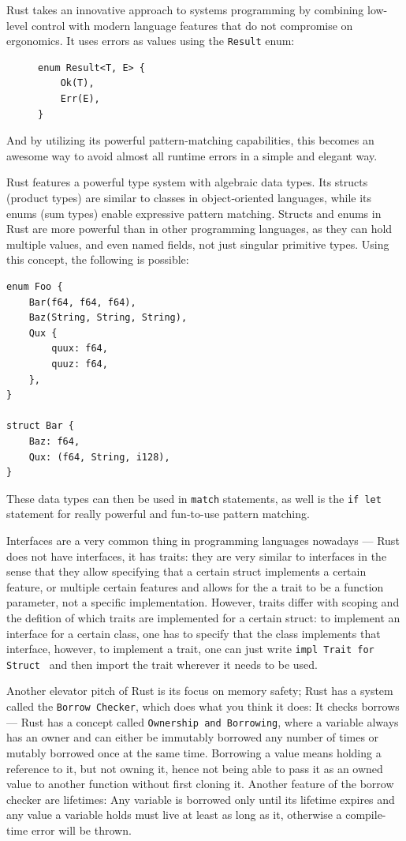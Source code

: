 Rust takes an innovative approach to systems programming by combining low-level control with modern language features
that do not compromise on ergonomics. It uses errors as values using the \texttt{Result} enum:

\begin{figure}[H]
    \begin{verbatim}
enum Result<T, E> {
    Ok(T),
    Err(E),
}
    \end{verbatim}
\end{figure}

And by utilizing its powerful pattern-matching capabilities, this becomes an awesome way to avoid almost all runtime errors
in a simple and elegant way.

Rust features a powerful type system with algebraic data types.
Its structs (product types) are similar to classes in object‑oriented languages,
while its enums (sum types) enable expressive pattern matching.
Structs and enums in Rust are more powerful than in other programming languages,
as they can hold multiple values, and even named fields, not just singular primitive types.
Using this concept, the following is possible:
\begin{verbatim}
enum Foo {
    Bar(f64, f64, f64),
    Baz(String, String, String),
    Qux {
        quux: f64,
        quuz: f64,
    },
}

struct Bar {
    Baz: f64,
    Qux: (f64, String, i128),
}
\end{verbatim}

These data types can then be used in \texttt{match} statements, as well is the \texttt{if let} statement
for really powerful and fun-to-use pattern matching.

Interfaces are a very common thing in programming languages nowadays ---
Rust does not have interfaces, it has traits: they are very similar to interfaces
in the sense that they allow specifying that a certain struct implements a certain feature,
or multiple certain features and allows for the a trait to be a function parameter,
not a specific implementation. However, traits differ with scoping and the defition of which traits are implemented for a certain struct:
to implement an interface for a certain class, one has to specify that the class implements that interface,
however, to implement a trait, one can just write \texttt{impl Trait for Struct {}} and then import the trait wherever it needs to be used.

Another elevator pitch of Rust is its focus on memory safety; Rust has a system called the \texttt{Borrow Checker}, which
does what you think it does: It checks borrows --- Rust has a concept called \texttt{Ownership and Borrowing},
where a variable always has an owner and can either be immutably borrowed any number of times or mutably borrowed once at the same time.
Borrowing a value means holding a reference to it, but not owning it, hence not being able to pass it as an owned value
to another function without first cloning it. Another feature of the borrow checker are lifetimes:
Any variable is borrowed only until its lifetime expires and any value a variable holds must live
at least as long as it, otherwise a compile-time error will be thrown.

